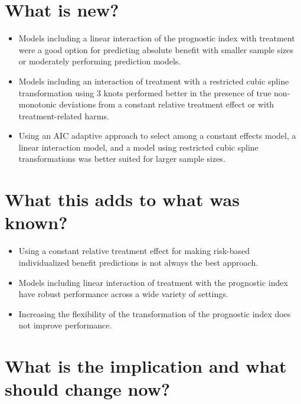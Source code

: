 \documentclass[]{elsarticle} %
\providecommand{\tightlist}{%
  \setlength{\itemsep}{0pt}\setlength{\parskip}{0pt}}
\begin{document}
\doublespacing 
\linenumbers

\hypertarget{what-is-new}{%
\section*{What is new?}\label{what-is-new}}

\begin{itemize}
\tightlist
\item
  Models including a linear interaction of the prognostic index with
  treatment were a good option for predicting absolute benefit with
  smaller sample sizes or moderately performing prediction models.
\item
  Models including an interaction of treatment with a restricted cubic
  spline transformation using 3 knots performed better in the presence
  of true non-monotonic deviations from a constant relative treatment
  effect or with treatment-related harms.
\item
  Using an AIC adaptive approach to select among a constant effects
  model, a linear interaction model, and a model using restricted cubic
  spline transformations was better suited for larger sample sizes.
\end{itemize}

\hypertarget{what-this-adds-to-what-was-known}{%
\section*{What this adds to what was
known?}\label{what-this-adds-to-what-was-known}}

\begin{itemize}
\tightlist
\item
  Using a constant relative treatment effect for making risk-based
  individualized benefit predictions is not always the best approach.
\item
  Models including linear interaction of treatment with the prognostic
  index have robust performance across a wide variety of settings.
\item
  Increasing the flexibility of the transformation of the prognostic
  index does not improve performance.
\end{itemize}

\hypertarget{what-is-the-implication-and-what-should-change-now}{%
\section*{What is the implication and what should change
now?}\label{what-is-the-implication-and-what-should-change-now}}
\end{document}
